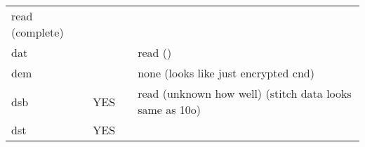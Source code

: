 \begin{longtable}[]{@{}llll@{}}
\begin{minipage}[t]{0.22\columnwidth}
read (complete)\strut
\end{minipage}\tabularnewline
\begin{minipage}[t]{0.19\columnwidth}\raggedright
dat\strut
\end{minipage} & \begin{minipage}[t]{0.22\columnwidth}\raggedright
\strut
\end{minipage} & \begin{minipage}[t]{0.25\columnwidth}\raggedright
\strut
\end{minipage} & \begin{minipage}[t]{0.22\columnwidth}\raggedright
read ()\strut
\end{minipage}\tabularnewline
\begin{minipage}[t]{0.19\columnwidth}\raggedright
dem\strut
\end{minipage} & \begin{minipage}[t]{0.22\columnwidth}\raggedright
\strut
\end{minipage} & \begin{minipage}[t]{0.25\columnwidth}\raggedright
\strut
\end{minipage} & \begin{minipage}[t]{0.22\columnwidth}\raggedright
none (looks like just encrypted cnd)\strut
\end{minipage}\tabularnewline
\begin{minipage}[t]{0.19\columnwidth}\raggedright
dsb\strut
\end{minipage} & \begin{minipage}[t]{0.22\columnwidth}\raggedright
YES\strut
\end{minipage} & \begin{minipage}[t]{0.25\columnwidth}\raggedright
\strut
\end{minipage} & \begin{minipage}[t]{0.22\columnwidth}\raggedright
read (unknown how well) (stitch data looks same as 10o)\strut
\end{minipage}\tabularnewline
\begin{minipage}[t]{0.19\columnwidth}\raggedright
dst\strut
\end{minipage} & \begin{minipage}[t]{0.22\columnwidth}\raggedright
YES\strut
\end{minipage} & \begin{minipage}[t]{0.25\columnwidth}\raggedright
\strut
\end{minipage} & \begin{minipage}[t]{0.22\columnwidth}\raggedright

\end{minipage}
\end{longtable}
